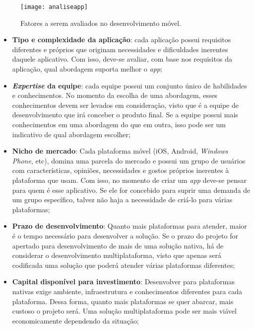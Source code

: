 \begin{figure}[H]
	\centering
	\texttt{[image: analiseapp]}
	\caption[Fatores a serem avaliados no desenvolvimento móvel]{ Fatores a serem avaliados no desenvolvimento móvel.}
	\label{fig:analiseapp}
\end{figure}

\begin{itemize}
    \item \textbf{Tipo e complexidade da aplicação}: cada aplicação possui requisitos diferentes e próprios que originam necessidades e dificuldades inerentes daquele aplicativo. Com isso, deve-se avaliar,
    com base nos requisitos da aplicação, qual abordagem suporta melhor o \textit{app};
    \item \textbf{\textit{Expertise} da equipe}: cada equipe possui um conjunto único de habilidades e conhecimentos. No momento da escolha de uma abordagem, esses conhecimentos
    devem ser levados em consideração, visto que é a equipe de desenvolvimento que irá conceber o produto final. Se a equipe possui mais conhecimentos em uma abordagem do que em outra, isso pode ser 
    um indicativo de qual abordagem escolher;
    \item \textbf{Nicho de mercado}: Cada plataforma móvel (iOS, Android, \textit{Windows Phone}, etc), domina uma parcela do mercado e possui um grupo de usuários com 
    características, opiniões, necessidades e gostos próprios inerentes à plataforma que usam. Com isso, no momento de criar um \textit{app} deve-se pensar para quem é esse aplicativo. Se ele for concebido 
    para suprir uma demanda de um grupo específico, talvez não haja a necessidade de criá-lo para várias plataformas;
    \item \textbf{Prazo de desenvolvimento}: Quanto mais plataformas para atender, maior é o tempo necessário para desenvolver a solução. Se o prazo do projeto for apertado para desenvolvimento de mais de uma solução 
    nativa, há de considerar o desenvolvimento multiplataforma, visto que apenas será codificada uma solução que poderá atender várias plataformas diferentes;
    \item \textbf{Capital disponível para investimento}: Desenvolver para plataformas nativas exige ambiente, infraestrutura e conhecimentos diferentes para cada plataforma. Dessa forma, quanto mais plataformas se 
    quer abarcar, mais custoso o projeto será. Uma solução multiplataforma pode ser mais viável economicamente dependendo da situação;
\end{itemize}

